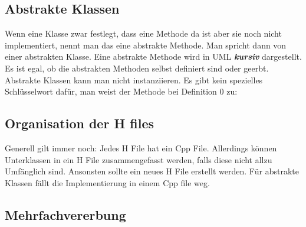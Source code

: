 \begin{center}
\end{center}

\nextcol

\subsection{Abstrakte Klassen}\label{Abstrakt}

Wenn eine Klasse zwar festlegt, dass eine Methode da ist aber sie noch nicht implementiert, nennt man das eine abstrakte Methode. 
Man spricht dann von einer abstrakten Klasse.
Eine abstrakte Methode wird in UML \textit{\textbf{kursiv}} dargestellt.
Es ist egal, ob die abstrakten Methoden selbst definiert sind oder geerbt. 
Abstrakte Klassen kann man nicht instanziieren.
Es gibt kein spezielles Schlüsselwort dafür, man weist der Methode bei Definition 0 zu: 



\subsection{Organisation der H files}

Generell gilt immer noch: Jedes H File hat ein Cpp File. 
Allerdings können Unterklassen in ein H File zusammengefasst werden, falls diese nicht allzu Umfänglich sind. 
Ansonsten sollte ein neues H File erstellt werden. 
Für abstrakte Klassen fällt die Implementierung in einem Cpp file weg.

\subsection{Mehrfachvererbung}

